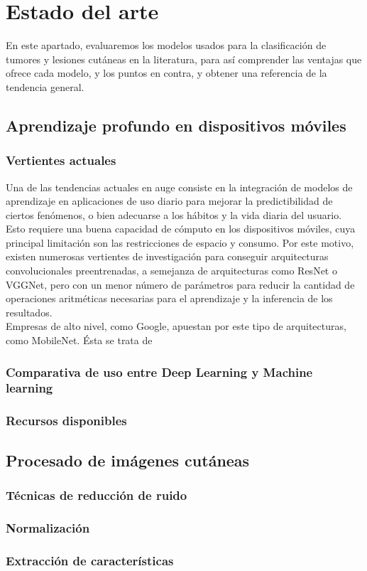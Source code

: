 \chapter{Estado del arte}

En este apartado, evaluaremos los modelos usados para la clasificación de tumores y lesiones cutáneas en la literatura, para así comprender las ventajas que ofrece cada modelo, y los puntos en contra, y obtener una referencia de la tendencia general.

\section{Aprendizaje profundo en dispositivos móviles}
\subsection{Vertientes actuales}
Una de las tendencias actuales en auge consiste en la integración de modelos de aprendizaje en aplicaciones de uso diario para mejorar la predictibilidad de ciertos fenómenos, o bien adecuarse a los hábitos y la vida diaria del usuario. Esto requiere una buena capacidad de cómputo en los dispositivos móviles, cuya principal limitación son las restricciones de espacio y consumo. Por este motivo, existen numerosas vertientes de investigación para conseguir arquitecturas convolucionales preentrenadas, a semejanza de arquitecturas como ResNet o VGGNet, pero con un menor número de parámetros para reducir la cantidad de operaciones aritméticas necesarias para el aprendizaje y la inferencia de los resultados.\\

Empresas de alto nivel, como Google, apuestan por este tipo de arquitecturas, como MobileNet. Ésta se trata de 
\subsection{Comparativa de uso entre Deep Learning y Machine learning}
\subsection{Recursos disponibles}


\section{Procesado de imágenes cutáneas}
\subsection{Técnicas de reducción de ruido}
\subsection{Normalización}
\subsection{Extracción de características}


